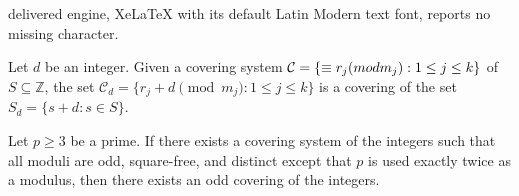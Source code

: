 \documentclass[10pt,a4paper]{amsart}
\renewcommand{\mod}[2]{\equiv#1\textup{ (mod }#2\textup{)}}
\begin{document}
delivered engine, XeLaTeX with its default Latin Modern text font, reports no missing character.
\begin{lemma}\label{lem:shifted}
Let $d$ be an integer.  Given a covering system $\mathcal{C}=\{\mod{r_j}{m_j}: 1\leq j\leq k\}$ of $S\subseteq\mathbb{Z}$, the set $\mathcal{C}_
d=\{r_j+d\pmod{m_j}:1\leq j\leq k\}$ is a covering of the set $S_d=\{s+d:s\in S\}$.
\end{lemma}

\begin{theorem}\label{thm:3sqrfreeimpliesodd}
Let $p\geq3$ be a prime. If there exists a covering system of the integers such that all moduli are odd, square-free, and distinct except that $p$ is used exactly twice as a modulus, then there exists an odd covering of the integers.
\end{theorem}
\end{document}

